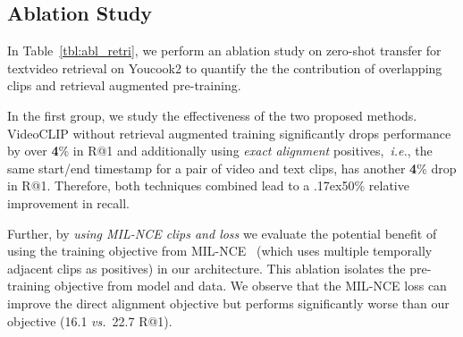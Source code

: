 \documentclass[11pt]{article}
\newcommand{\app}{\raise.17ex\hbox{}}
\begin{document}
\subsection{Ablation Study}
In Table~\ref{tbl:abl_retri},
we perform an ablation study on zero-shot transfer for textvideo retrieval on Youcook2 to quantify the 
the contribution of overlapping clips and retrieval augmented pre-training.

In the first group, we study the effectiveness of the two proposed methods.
VideoCLIP without retrieval augmented training significantly drops performance by over \textbf{4}\%  in R@1 and additionally using \textit{exact alignment} positives,~\textit{i.e.}, the same start/end timestamp for a pair of video and text clips, has another \textbf{4}\% drop in R@1. Therefore, both techniques combined lead to a \app50\% relative improvement in recall.

Further, by \textit{using MIL-NCE clips and loss} we evaluate the potential benefit of using the training objective from MIL-NCE~\cite{miech2020end} (which uses multiple temporally adjacent clips as positives) in our architecture. This ablation isolates the pre-training objective from model and data.
We observe that the MIL-NCE loss can improve the direct alignment objective but performs significantly worse than our objective (16.1 \textit{vs.}~22.7 R@1). 






\begin{table}[t!]
\centering
\setlength\tabcolsep{2.0pt}

\caption{Ablation on \textit{textvideo retrieval} (Youcook2).
}
\label{tbl:abl_retri}
\end{table}
\end{document}
